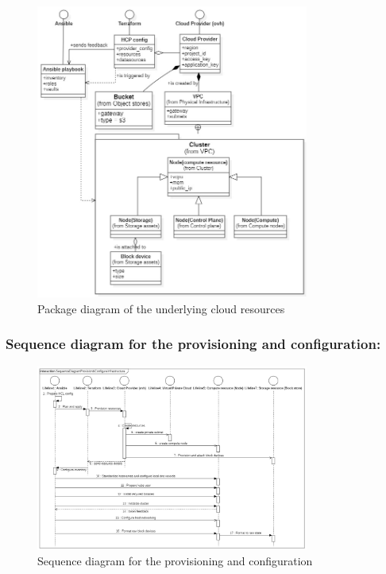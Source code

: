 \begin{figure}[!ht]\centering
\includegraphics[width=0.8\textwidth,angle=00]{assets/f2.jpg}
\caption{Package diagram of the underlying cloud resources}
\label{fig:f2}
\end{figure}

\subsubsection{Sequence diagram for the provisioning and configuration:}

\begin{figure}[!ht]\centering
\includegraphics[width=0.8\textwidth,angle=00]{assets/f3.jpg}
\caption{Sequence diagram for the provisioning and configuration}
\label{fig:f3}
\end{figure}

